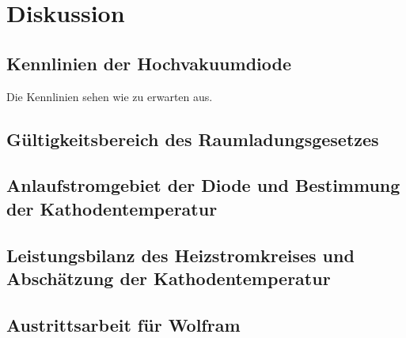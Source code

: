 \section{Diskussion}
\label{sec:Diskussion}

\subsection{Kennlinien der Hochvakuumdiode}
Die Kennlinien sehen wie zu erwarten aus.

\subsection{Gültigkeitsbereich des Raumladungsgesetzes}

\subsection{Anlaufstromgebiet der Diode und Bestimmung der Kathodentemperatur}

\subsection{Leistungsbilanz des Heizstromkreises und Abschätzung der Kathodentemperatur}

\subsection{Austrittsarbeit für Wolfram}
